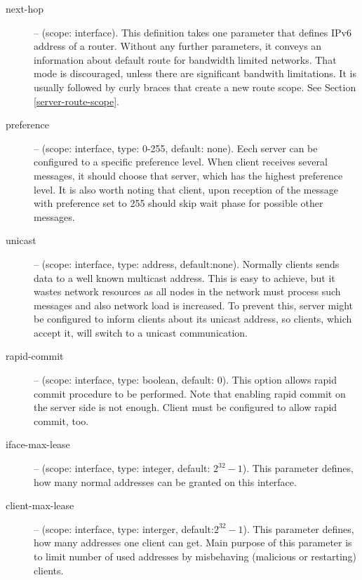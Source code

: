 \begin{description}
\item[next-hop] -- (scope: interface). This definition takes one
parameter that defines IPv6 address of a router. Without any further
parameters, it conveys an information about default route for
bandwidth limited networks. That mode is discouraged, unless there are
significant bandwith limitations. It is usually followed by curly
braces that create a new route scope. See Section \ref{server-route-scope}.

 \item[preference] -- (scope: interface, type: 0-255, default:
            none). Eech server can be configured to a specific
            preference level. When client receives several
             messages, it should choose that server,
            which has the highest preference level. It is also worth
            noting that client, upon reception of the 
            message with preference set to 255 should skip wait phase
            for possible other  messages.


 \item[unicast] -- (scope: interface, type: address,
            default:none). Normally clients sends data to a well known
            multicast address. This is easy to achieve, but it wastes
            network resources as all nodes in the network must process
            such messages and also network load is increased. To prevent
            this, server might be configured to inform clients about its
            unicast address, so clients, which accept it, will switch to
            a unicast communication.

 \item[rapid-commit] -- (scope: interface, type: boolean, default:
            0). This option allows rapid commit procedure to be
            performed. Note that enabling rapid commit on the server
            side is not enough. Client must be configured to allow
            rapid commit, too.

\item[iface-max-lease] -- (scope: interface, type: integer, default:
            $2^{32}-1$). This parameter defines, how many normal
            addresses can be granted on this interface.

\item[client-max-lease] -- (scope: interface, type: interger,
            default:$2^{32}-1$). This parameter defines, how many
            addresses one client can get. Main purpose of this
            parameter is to limit number of used addresses by
            misbehaving (malicious or restarting) clients.


\end{description}
